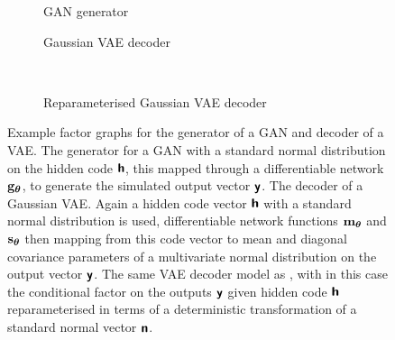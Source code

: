 \begin{figure}[!t]
\centering
\begin{subfigure}[t]{.35\linewidth}
\centering
{}
\caption{\acs{GAN} generator}\label{sfig:gan-generator}
\end{subfigure}%
\begin{subfigure}[t]{.55\linewidth}
\centering
{}
\caption{Gaussian \acs{VAE} decoder}\label{sfig:vae-decoder-marginalised}
\end{subfigure}%
\\[3mm]
\begin{subfigure}[t]{.8\linewidth}
\centering
{}
\caption{Reparameterised Gaussian \acs{VAE} decoder}\label{sfig:vae-decoder}
\end{subfigure}%
\caption[Differentiable generator network factor graphs.]{Example factor graphs for the generator of a \ac{GAN} and decoder of a \ac{VAE}.  The generator for a \ac{GAN} with a standard normal distribution on the hidden code $\boldsymbol{\mathsf{h}}$, this mapped through a differentiable network ${\mathbf{g}}_{\boldsymbol{\theta}}$, to generate the simulated output vector $\boldsymbol{\mathsf{y}}$.  The decoder of a Gaussian \ac{VAE}. Again a hidden code vector $\boldsymbol{\mathsf{h}}$ with a standard normal distribution is used, differentiable network functions ${\mathbf{m}}_{\boldsymbol{\theta}}$ and ${\mathbf{s}}_{\boldsymbol{\theta}}$ then mapping from this code vector to mean and diagonal covariance parameters of a multivariate normal distribution on the output vector $\boldsymbol{\mathsf{y}}$.  The same \ac{VAE} decoder model as , with in this case the conditional factor on the outputs $\boldsymbol{\mathsf{y}}$ given hidden code $\boldsymbol{\mathsf{h}}$ reparameterised in terms of a deterministic transformation of a standard normal vector $\boldsymbol{\mathsf{n}}$.}

\end{figure}
